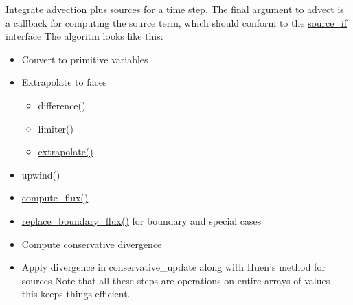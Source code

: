 Integrate \hyperlink{a00026}{advection} plus sources for a time step. The final argument to advect is a callback for computing the source term, which should conform to the \hyperlink{a00036}{source\_\-if} interface The algoritm looks like this:\begin{itemize}
\item Convert to primitive variables\item Extrapolate to faces\begin{itemize}
\item difference()\item limiter()\item \hyperlink{a00026_36ba824cb5dc6ca6127866376d2e79ec}{extrapolate()}\end{itemize}
\item upwind()\item \hyperlink{a00026_3947a8a29b1c666b2d1b7223215e9873}{compute\_\-flux()}\item \hyperlink{a00026_ce0b27ec0ac171c15a919d07fb3b32c3}{replace\_\-boundary\_\-flux()} for boundary and special cases\item Compute conservative divergence\item Apply divergence in conservative\_\-update along with Huen's method for sources Note that all these steps are operations on entire arrays of values -- this keeps things efficient. \end{itemize}


